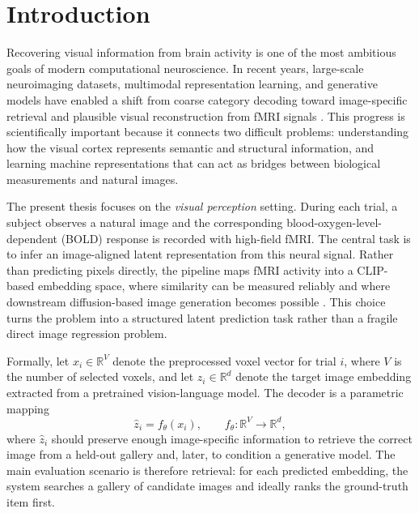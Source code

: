 
\chapter{Introduction}
\label{chap:introduction}

Recovering visual information from brain activity is one of the most ambitious goals of modern computational neuroscience. In recent years, large-scale neuroimaging datasets, multimodal representation learning, and generative models have enabled a shift from coarse category decoding toward image-specific retrieval and plausible visual reconstruction from fMRI signals \cite{Allen2022,Ozcelik2023,Scotti2023,Scotti2024}. This progress is scientifically important because it connects two difficult problems: understanding how the visual cortex represents semantic and structural information, and learning machine representations that can act as bridges between biological measurements and natural images.

The present thesis focuses on the \emph{visual perception} setting. During each trial, a subject observes a natural image and the corresponding blood-oxygen-level-dependent (BOLD) response is recorded with high-field fMRI. The central task is to infer an image-aligned latent representation from this neural signal. Rather than predicting pixels directly, the pipeline maps fMRI activity into a CLIP-based embedding space, where similarity can be measured reliably and where downstream diffusion-based image generation becomes possible \cite{Radford2021,Rombach2022}. This choice turns the problem into a structured latent prediction task rather than a fragile direct image regression problem.

Formally, let $x_i \in \mathbb{R}^{V}$ denote the preprocessed voxel vector for trial $i$, where $V$ is the number of selected voxels, and let $z_i \in \mathbb{R}^{d}$ denote the target image embedding extracted from a pretrained vision-language model. The decoder is a parametric mapping
\begin{equation}
\hat{z}_i = f_{\theta}(x_i), \qquad f_{\theta}: \mathbb{R}^{V} \rightarrow \mathbb{R}^{d},
\label{eq:intro_mapping}
\end{equation}
where $\hat{z}_i$ should preserve enough image-specific information to retrieve the correct image from a held-out gallery and, later, to condition a generative model. The main evaluation scenario is therefore retrieval: for each predicted embedding, the system searches a gallery of candidate images and ideally ranks the ground-truth item first.

